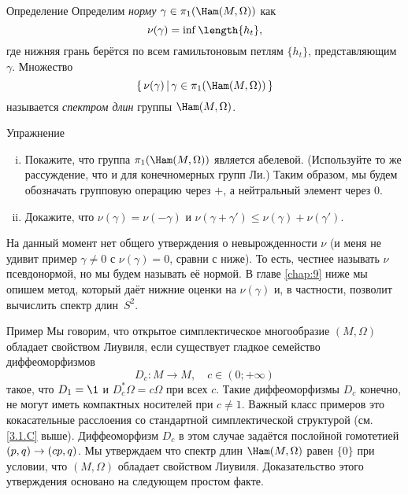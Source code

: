 \begin{thm}{Определение}\label{7.3.A}
Определим \emph{норму} $\gamma \in \pi_1 (\Ham (M, \Omega))$ как
\[\nu (\gamma) = \inf \length \{h_t\},\]
где нижняя грань берётся по всем гамильтоновым петлям $\{h_t\}$, представляющим $\gamma$.
Множество 
\[\set{\nu (\gamma)}{\gamma \in \pi_1 (\Ham (M, \Omega))}\]
называется \emph{спектром длин} группы $\Ham (M, \Omega)$.
\end{thm}

\begin{thm*}{Упражнение}

\begin{enumerate}[(i)]
 \item Покажите, что группа $\pi_1 (\Ham (M, \Omega))$ является абелевой. (Используйте то же рассуждение, что и для конечномерных групп Ли.)
Таким образом, мы будем обозначать групповую операцию через $+$, а нейтральный элемент через $0$.
 \item Докажите, что $\nu (\gamma) = \nu (-\gamma)$ и $\nu (\gamma + \gamma') \le \nu (\gamma) + \nu (\gamma')$.
\end{enumerate}

\end{thm*}

На данный момент нет общего утверждения о невырожденности $\nu$ (и меня не удивит пример $\gamma \ne 0$ с $\nu (\gamma) = 0$, сравни с
 ниже).
То есть, честнее называть $\nu$ псевдонормой, но мы будем называть её нормой.
В главе \ref{chap:9} ниже мы опишем метод, который даёт нижние оценки на $\nu (\gamma)$ и, в частности, позволит вычислить спектр длин~$S^2$.

\begin{thm}{Пример}\label{7.3.B}
Мы говорим, что открытое симплектическое многообразие $(M, \Omega)$ обладает свойством Лиувиля, если существует гладкое семейство диффеоморфизмов
\[D_c: M \to M,\quad c \in (0; + \infty)\]
такое, что $D_1 = \1$ и $D_c^\ast \Omega = c\Omega$ при всех $c$.
Такие диффеоморфизмы $D_c$ конечно, не могут иметь компактных носителей при $c \ne 1$.
Важный класс примеров это кокасательные расслоения со стандартной
симплектической структурой (см. \ref{3.1.C} выше).
Диффеоморфизм $D_c$ в этом случае задаётся послойной гомотетией $(p, q) \z\to (cp, q)$.
Мы утверждаем что спектр длин $\Ham (M, \Omega)$ равен $\{0\}$ при условии, что $(M, \Omega)$
обладает свойством Лиувиля.
Доказательство этого утверждения основано на следующем простом факте.
\end{thm}

